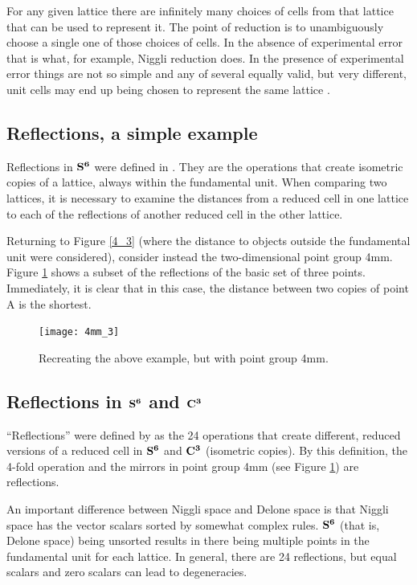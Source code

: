 \documentclass[preprint]{iucr}              %
\numberwithin{equation}{section}
\newcommand{\SVI}[0]{$\bf{S^{6}}$}
\newcommand{\CIII}[0]{$\bf{C^{3}}$}
\begin{document}
	For any given lattice there are infinitely many choices of cells from that lattice that can be used to represent it.  The point of reduction is to unambiguously choose a single one of those choices of cells.  In the absence of
	experimental error that is what, for example, Niggli reduction does.  In the presence of experimental error things are not
	so simple and any of several equally valid,
	but very different, unit cells may end up being chosen
	to represent the same lattice \cite{Gruber1973} \cite{McGill2014}.
	
		
	\subsection{Reflections, a simple example}
	
	Reflections in \SVI{} were defined in . They are
	the operations that create isometric copies of a lattice, always within the
	fundamental unit. When comparing two lattices, it is necessary to 
	examine the distances from a reduced cell in one lattice to each of the reflections of another reduced cell in the other lattice.
	
	Returning to Figure \ref{4_3} (where the distance to objects
	outside the fundamental unit were considered), consider instead the
	 two-dimensional point group 4mm. Figure
	\ref{4mm_3} shows a subset of the reflections of the basic set of three points.
	Immediately, it is clear that in this case, the 
	distance between two copies of
	point A is the shortest.
	
\begin{centering}
\begin{figure}
	\texttt{[image: 4mm\_3]}
	\label{4mm_3}
	\caption{Recreating the above example, but with point group 4mm. }
\end{figure}
\end{centering}

\subsection{Reflections in \SVI{} and \CIII{}}

``Reflections'' were defined by as
the 24 operations that create different, reduced versions of
a reduced cell in \SVI{} and \CIII{} (isometric copies).
By this definition, the 
4-fold operation and the mirrors in point group 4mm (see Figure \ref{4mm_3})
are reflections.

	An important difference between Niggli space and Delone space
	is that Niggli space has the vector scalars sorted by 
	somewhat complex rules. \SVI{} (that is, Delone space)
	being unsorted results in there being multiple points in the
	fundamental unit for each lattice. In general, there are 24 
	reflections, but equal scalars and zero scalars can lead to degeneracies.
	
\end{document}
